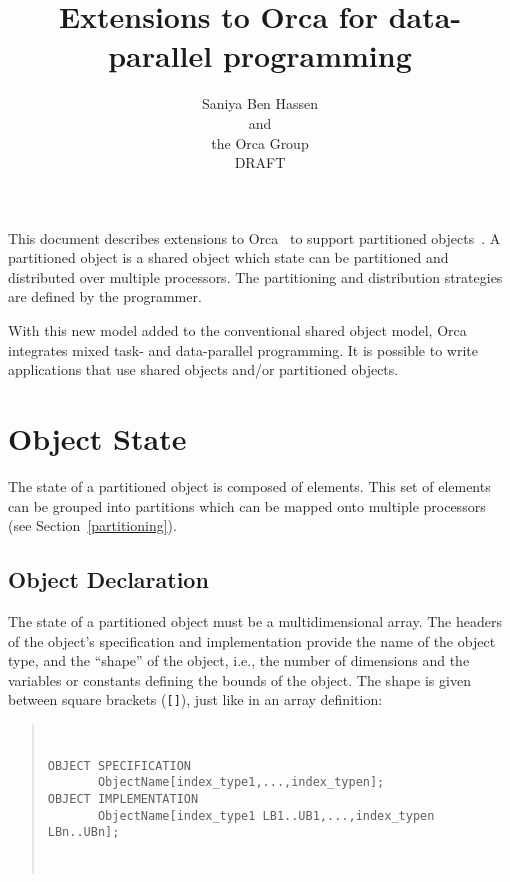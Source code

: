 \documentclass{article}
\title{Extensions to Orca for data-parallel programming}
\author{Saniya Ben Hassen \\ and \\ the Orca Group \\ DRAFT }
\newenvironment{example}
  {\begin{quote} ~\hrulefill }
  {~\hrulefill \end{quote} }
\begin{document}
\begin{htmlonly}
\renewcommand{\rightarrow}{->}
\renewcommand{\Rightarrow}{=>}
\end{htmlonly}


\maketitle
\tableofcontents

\newpage


This document describes extensions to Orca~\cite{bal89} to support
partitioned objects~\cite{ics96}. A partitioned object is a shared
object which state can be partitioned and distributed over multiple
processors. The partitioning and distribution strategies are defined
by the programmer. 

With this new model added to the conventional shared object model,
Orca integrates mixed task- and data-parallel programming. It is
possible to write applications that use shared objects and/or
partitioned objects.

\section{Object State}
\label{ObjectState}

The state of a partitioned object is composed of elements. This set of
elements can be grouped into partitions which can be mapped onto
multiple processors (see Section~\ref{partitioning}).

\subsection{Object Declaration}

The state of a partitioned object must be a multidimensional
array. The headers of the object's specification and implementation
provide the name of the object type, and the ``shape'' of the object,
i.e., the number of dimensions and the variables or constants defining
the bounds of the object. The shape is given between square brackets
(\verb+[]+), just like in an array definition:

\begin{example}
\begin{verbatim}
OBJECT SPECIFICATION 
       ObjectName[index_type1,...,index_typen];
OBJECT IMPLEMENTATION 
       ObjectName[index_type1 LB1..UB1,...,index_typen LBn..UBn];
\end{verbatim} 
\end{example}
\end{document}
